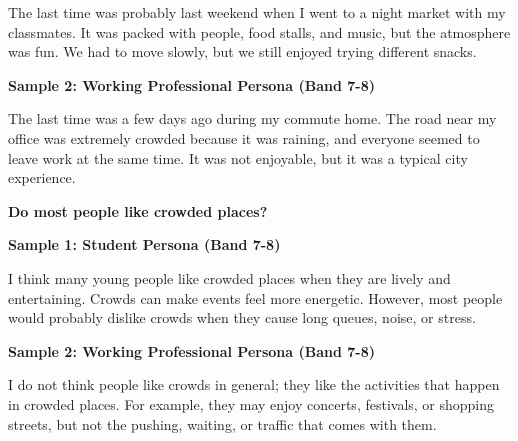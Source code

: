 The last time was probably last weekend when I went to a night market with my classmates. It was packed with people, food stalls, and music, but the atmosphere was fun. We had to move slowly, but we still enjoyed trying different snacks.

\textbf{Sample 2: Working Professional Persona (Band 7-8)}

The last time was a few days ago during my commute home. The road near my office was extremely crowded because it was raining, and everyone seemed to leave work at the same time. It was not enjoyable, but it was a typical city experience.

\separator

\begin{ieltsquestion}
\textbf{Do most people like crowded places?}
\end{ieltsquestion}
\textbf{Sample 1: Student Persona (Band 7-8)}

I think many young people like crowded places when they are lively and entertaining. Crowds can make events feel more energetic. However, most people would probably dislike crowds when they cause long queues, noise, or stress.

\textbf{Sample 2: Working Professional Persona (Band 7-8)}

I do not think people like crowds in general; they like the activities that happen in crowded places. For example, they may enjoy concerts, festivals, or shopping streets, but not the pushing, waiting, or traffic that comes with them.

\separator


